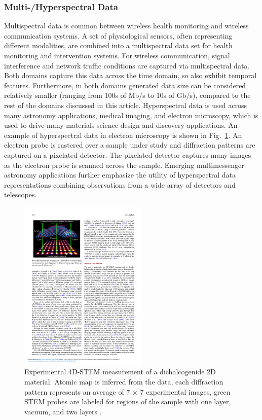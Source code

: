  \subsubsection{Multi-/Hyperspectral Data}
 Multispectral data is common between wireless health monitoring and wireless communication systems. A set of physiological sensors, often representing different modalities, are combined into a multispectral data set for health monitoring and intervention systems. For wireless communication, signal interference and network traffic conditions are captured via multispectral data. Both domains capture this data across the time domain, so also exhibit temporal features. Furthermore, in both domains generated data size can be considered relatively smaller (ranging from 100s of Mb/s to 10s of Gb/s), compared to the rest of the domains discussed in this article. Hyperspectral data is used across many astronomy applications, medical imaging, and electron microscopy, which is used to drive many materials science design and discovery applications. An example of hyperspectral data in electron microscopy is shown in Fig.~\ref{fig:rephyper}.  An electron probe is rastered over a sample under study and diffraction patterns are captured on a pixelated detector.  The pixelated detector captures many images as the electron probe is scanned across the sample.  Emerging multimessenger astronomy applications further emphasize the utility of hyperspectral data representations combining observations from a wide array of detectors and telescopes. 
 
 \begin{figure}[tbh!]
     \centering
     \includegraphics[width = 0.55\textwidth]{figures/TEM.pdf}
     \caption{Experimental 4D-STEM measurement of a dichalcogenide 2D material. Atomic map is inferred from the data, each diffraction pattern represents an average of 7 × 7 experimental images, green STEM probes are labeled for regions of the sample with one layer, vacuum, and two layers \cite{ophus_2019}.}
     \label{fig:rephyper}
 \end{figure}
 

